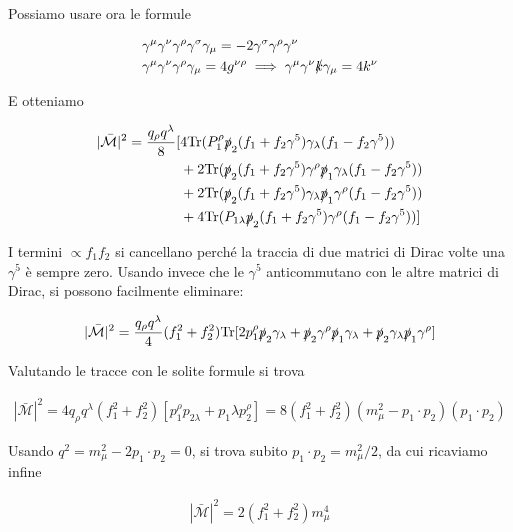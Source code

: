 \documentclass[11pt]{report}
\begin{document}
Possiamo usare ora le formule 

\begin{align}
    &\gamma^\mu \gamma^\nu \gamma^\rho \gamma^\sigma \gamma_\mu = -2\gamma^\sigma \gamma^\rho \gamma^\nu \notag \\
    &\gamma^\mu \gamma^\nu \gamma^\rho \gamma_\mu = 4g^{\nu\rho} \implies \gamma^\mu \gamma^\nu \slashed{k} \gamma_\mu = 4k^\nu
\end{align}

E otteniamo 

\begin{align}
    |\mathcal{\bar{M}}|^2 = \frac{q_\rho q^\lambda}{8}[&4\text{Tr}(P_1^\rho \slashed{p}_2 (f_1+f_2\gamma^5)\gamma_\lambda(f_1-f_2\gamma^5)) \notag \\
    &+2\text{Tr}(\slashed{p}_2 (f_1+f_2\gamma^5)\gamma^\rho \slashed{p}_1 \gamma_\lambda(f_1-f_2\gamma^5)) \notag \\
    &+2\text{Tr}(\slashed{p}_2 (f_1+f_2\gamma^5)\gamma_\lambda \slashed{p}_1 \gamma^\rho (f_1-f_2\gamma^5)) \notag \\
    &+4\text{Tr}(P_{1\lambda} \slashed{p}_2 (f_1+f_2\gamma^5)\gamma^\rho(f_1-f_2\gamma^5))] 
\end{align}

I termini \(\propto f_1f_2\) si cancellano perché la traccia di due matrici di Dirac volte una \(\gamma^5\) è sempre zero. Usando invece che le \(\gamma^5\) anticommutano con le altre matrici di Dirac, si possono facilmente eliminare: 

\begin{align}
    |\mathcal{\bar{M}}|^2 = \frac{q_\rho q^\lambda}{4}(f_1^2+f_2^2)\text{Tr}[2p_1^\rho \slashed{p}_2\gamma_\lambda + \slashed{p}_2 \gamma^\rho \slashed{p}_1\gamma_\lambda + \slashed{p}_2\gamma_\lambda \slashed{p}_1 \gamma^\rho ]
\end{align}

Valutando le tracce con le solite formule si trova 

\begin{align}
    |\mathcal{\bar{M}}|^2 = 4q_\rho q^\lambda (f_1^2+f_2^2)[p_1^\rho p_{2\lambda} + p_1\lambda p_2^\rho] = 8(f_1^2+f_2^2)(m_\mu^2 - p_1\cdot p_2)(p_1\cdot p_2)
\end{align}

Usando \(q^2 = m_\mu^2 - 2p_1\cdot p_2 = 0\), si trova subito \(p_1\cdot p_2 = m_\mu^2/2\), da cui ricaviamo infine 

\begin{align}
    |\mathcal{\bar{M}}|^2 = 2(f_1^2+f_2^2)m^4_\mu
\end{align}
\end{document}
